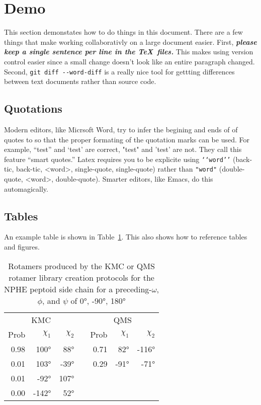 \section{Demo}
This section demonstates how to do things in this document.
There are a few things that make working collaborativly on a large document easier.
First, \textit{\textbf{please keep a single sentence per line in the \TeX\ files.}}
This makes using version control easier since a small change doesn't look like an entire paragraph changed.
Second, \texttt{git diff -{}-word-diff} is a really nice tool for gettting differences between text documents rather than source code.

\subsection{Quotations}
Modern editors, like Micrsoft Word, try to infer the begining and ends of of quotes to so that the proper formating of the quotation marks can be used. For example, ``test'' and `test' are correct, "test" and 'test' are not.
They call this feature ``smart quotes.''
Latex requires you to be explicite using \texttt{`{}`word'{}'} (back-tic, back-tic, <word>, single-quote, single-quote) rather than \texttt{"word"} (double-quote, <word>, double-quote).
Smarter editors, like Emacs, do this automagically.


\subsection{Tables}
An example table is shown in Table~\ref{supptbl:rot_lib_snpshot_nmeo}.
This also shows how to reference tables and figures.

\begin{table}
  \centering
  \caption{Rotamers produced by the KMC or QMS rotamer library creation protocols for the NPHE peptoid side chain for a preceding-$\omega$, $\phi$, and $\psi$ of \ang{0}, \ang{-90}, \ang{180}}
  \label{supptbl:rot_lib_snpshot_nmeo}
  \begin{tabular}{rrrcrrr}
    \toprule
    \multicolumn{3}{c}{KMC} && \multicolumn{3}{c}{QMS} \\
    \cmidrule{1-3} \cmidrule{5-7}
    Prob & $\chi_1$  & $\chi_2$ && Prob & $\chi_1$  & $\chi_2$ \\
    \midrule
    0.98 & \ang{100}  &  \ang{88}  && 0.71 & \ang{82}  &  \ang{-116} \\
    0.01 & \ang{103}  &  \ang{-39} && 0.29 & \ang{-91} &  \ang{-71}  \\
    0.01 & \ang{-92}  &  \ang{107} && ~ & ~ & ~ \\
    0.00 & \ang{-142} &  \ang{52}  && ~ & ~ & ~ \\
    \bottomrule
  \end{tabular}
\end{table}

